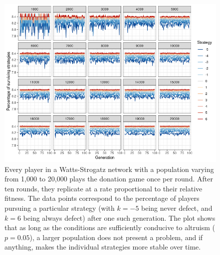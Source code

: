 \documentclass{JASSS}
\begin{document}
\begin{figure}
	\centering
	\includegraphics[width=\linewidth]{./figures/results_1000_20000_truthful_new.png}
	\caption{Every player in a Watts-Strogatz network with a population varying from 1,000 to 20,000 plays the donation game once per round. After ten rounds, they replicate at a rate proportional to their relative fitness. The data points correspond to the percentage of players pursuing a particular strategy (with $k=-5$ being never defect, and $k=6$ being always defect) after one such generation. The plot shows that as long as the conditions are sufficiently conducive to altruism ($p=0.05$), a larger population does not present a problem, and if anything, makes the individual strategies more stable over time.}
	\label{vary_N}
\end{figure}

\FloatBarrier


\theendnotes


 


\end{document}
